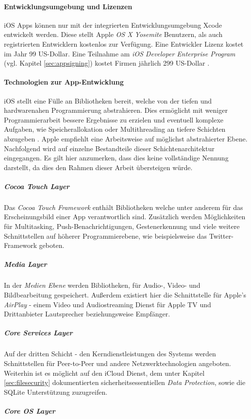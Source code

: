 		\paragraph{Entwicklungsumgebung und Lizenzen}
			iOS Apps können nur mit der integrierten Entwicklungsumgebung Xcode
			entwickelt werden. Diese stellt Apple \textsl{OS X Yosemite}
			Benutzern, als auch registrierten Entwicklern kostenlos zur Verfügung.
			Eine Entwickler Lizenz kostet im Jahr 99 US-Dollar. Eine Teilnahme am
			\textsl{iOS Developer Enterprise Program} (vgl. Kapitel \ref{sec:appsigning})
			kostet Firmen jährlich 299 US-Dollar \cite{AppleDev2015}.
		\paragraph{Technologien zur App-Entwicklung}
			iOS stellt eine Fülle an Bibliotheken bereit, welche von der
			tiefen und hardwarenahen Programmierung abstrahieren. Dies ermöglicht mit
			weniger Programmierarbeit bessere Ergebnisse zu erzielen und eventuell
			komplexe Aufgaben, wie Speicherallokation oder Multithreading an tiefere
			Schichten abzugeben \cite{AboutiOSTech2015}.
			Apple empfiehlt eine Arbeitsweise auf möglichst abstrahierter Ebene.
			Nachfolgend wird auf einzelne Bestandteile dieser Schichtenarchitektur
			eingegangen. Es gilt hier anzumerken, dass dies keine vollständige Nennung
			darstellt, da dies den Rahmen dieser Arbeit	übersteigen würde.
			\subparagraph{Cocoa Touch Layer}
				Das \textsl{Cocoa Touch Framework} enthält Bibliotheken welche unter anderem
				für das Erscheinungsbild einer App verantwortlich sind. Zusätzlich werden
				Möglichkeiten für Multitasking, Push-Benachrichtigungen, Gestenerkennung und
				viele weitere Schnittstellen auf höherer Programmierebene, wie beispielsweise
				das Twitter-Framework geboten.
			\subparagraph{Media Layer}
				In der \textsl{Medien Ebene} werden Bibliotheken, für
				Audio-, Video- und Bildbearbeitung gespeichert. Außerdem existiert hier die
				Schnittstelle für Apple's \textsl{AirPlay} - einem Video und Audiostreaming
				Dienst für Apple TV und Drittanbieter Lautsprecher beziehungsweise Empfänger.
			\subparagraph{Core Services Layer}
				Auf der dritten Schicht - den Kerndienstleistungen des Systems werden
				Schnittstellen für Peer-to-Peer und andere Netzwerktechnologien angeboten.
				Weiterhin ist es möglicht auf den iCloud Dienst, dem unter Kapitel
				\ref{sec:filesecurity} dokumentierten sicherheitsessentiellen \textsl{Data
				Protection}, sowie die SQLite Unterstützung zuzugreifen.
			\subparagraph{Core OS Layer}
